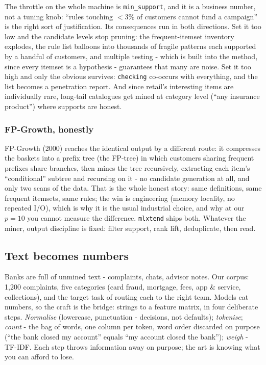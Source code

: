 \documentclass[11pt,a4paper]{article}
\begin{document}
The throttle on the whole machine is \texttt{min\_support}, and it is a
business number, not a tuning knob: ``rules touching $<$3\% of customers
cannot fund a campaign'' is the right sort of justification. Its
consequences run in both directions. Set it too low and the candidate
levels stop pruning: the frequent-itemset inventory explodes, the rule
list balloons into thousands of fragile patterns each supported by a
handful of customers, and multiple testing - which is built into the
method, since every itemset is a hypothesis - guarantees that many are
noise. Set it too high and only the obvious survives:
\texttt{checking} co-occurs with everything, and the list becomes a
penetration report. And since retail's interesting items are
individually rare, long-tail catalogues get mined at category level
(``any insurance product'') where supports are honest.

\subsubsection{FP-Growth, honestly}
FP-Growth (2000) reaches the identical output by a different route: it
compresses the baskets into a prefix tree (the FP-tree) in which
customers sharing frequent prefixes share branches, then mines the tree
recursively, extracting each item's ``conditional'' subtree and recursing
on it - no candidate generation at all, and only two scans of the data.
That is the whole honest story: same definitions, same frequent itemsets,
same rules; the win is engineering (memory locality, no repeated I/O),
which is why it is the usual industrial choice, and why at our $p = 10$
you cannot measure the difference. \texttt{mlxtend} ships both. Whatever
the miner, output discipline is fixed: filter support, rank lift,
deduplicate, then read.

\subsection{Text becomes numbers}
Banks are full of unmined text - complaints, chats, advisor notes. Our
corpus: 1{,}200 complaints, five categories (card fraud, mortgage, fees,
app \& service, collections), and the target task of routing each to the
right team. Models eat numbers, so the craft is the bridge: strings to a
feature matrix, in four deliberate steps. \emph{Normalise} (lowercase,
punctuation - decisions, not defaults); \emph{tokenise};
\emph{count} - the bag of words, one column per token, word order
discarded on purpose (``the bank closed my account'' equals ``my account
closed the bank''); \emph{weigh} - TF-IDF. Each step throws information
away on purpose; the art is knowing what you can afford to lose.
\end{document}
